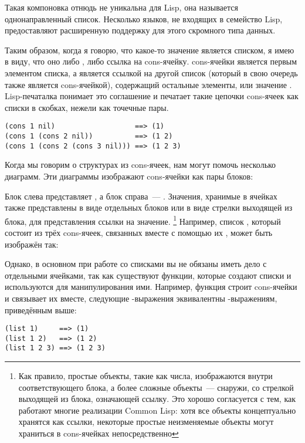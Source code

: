 Такая компоновка отнюдь не уникальна для Lisp, она называется однонаправленный
список. Несколько языков, не входящих в семейство Lisp, предоставляют расширенную
поддержку для этого скромного типа данных.

Таким образом, когда я говорю, что какое-то значение является списком, я имею в виду, что
оно либо , либо ссылка на cons-ячейку.  cons-ячейки является первым
элементом списка, а  является ссылкой на другой список (который в свою очередь
также является cons-ячейкой), содержащий остальные элементы, или значение
. Lisp-печаталка понимает это соглашение и печатает такие цепочки cons-ячеек как
списки в скобках, нежели как точечные пары.

\begin{lstlisting}
(cons 1 nil)                   ==> (1)
(cons 1 (cons 2 nil))          ==> (1 2)
(cons 1 (cons 2 (cons 3 nil))) ==> (1 2 3)
\end{lstlisting}

Когда мы говорим о структурах из cons-ячеек, нам могут помочь несколько диаграмм. Эти
диаграммы изображают cons-ячейки как пары блоков:


Блок слева представляет , а блок справа~--- . Значения, хранимые в
ячейках также представлены в виде отдельных блоков или в виде стрелки выходящей из блока,
для представления ссылки на значение. \footnote{Как правило, простые объекты, такие как
  числа, изображаются внутри соответствующего блока, а более сложные объекты~--- снаружи, со
  стрелкой выходящей из блока, означающей ссылку. Это хорошо согласуется с тем, как
  работают многие реализации Common Lisp: хотя все объекты концептуально хранятся как
  ссылки, некоторые простые неизменяемые объекты могут храниться в cons-ячейках
  непосредственно} Например, список , который состоит из трёх cons-ячеек,
связанных вместе с помощью их , может быть изображён так:


Однако, в основном при работе со списками вы не обязаны иметь дело с отдельными ячейками,
так как существуют функции, которые создают списки и используются для манипулирования
ими. Например, функция  строит cons-ячейки и связывает их вместе, следующие
-выражения эквивалентны -выражениям, приведённым выше:

\begin{lstlisting}
(list 1)     ==> (1)
(list 1 2)   ==> (1 2)
(list 1 2 3) ==> (1 2 3)
\end{lstlisting}

